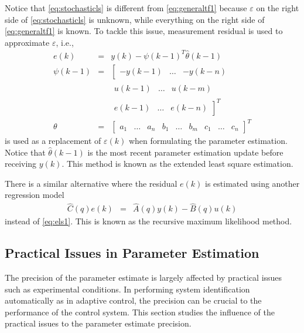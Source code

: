 Notice that \eqref{eq:stochasticls} is different from \eqref{eq:generaltf1} because $\varepsilon$ on the right side of \eqref{eq:stochasticls} is unknown, while everything on the right side of \eqref{eq:generaltf1} is known. To tackle this issue, measurement residual is used to approximate $\varepsilon$, i.e.,
\begin{eqnarray}
  e(k) &=& y(k) - \psi(k-1)^T\hat{\theta}(k-1) \label{eq:els1} \\
  \psi(k-1) &=& \left[\begin{array}{ccc}
                          -y(k-1) & \ldots & -y(k-n)
                        \end{array}\right. \nonumber \\
              & & \left.\begin{array}{ccc}
                          u(k-1) & \ldots & u(k-m)
                        \end{array}\right. \nonumber \\
              & & \left.\begin{array}{ccc}
                          e(k-1) & \ldots & e(k-n)
                        \end{array}\right]^T \nonumber \\
  \theta &=& \left[\begin{array}{ccccccccc}
                   a_1 & \ldots & a_n & b_1 & \ldots & b_m & c_1 & \ldots & c_n
                 \end{array}\right]^T \nonumber
\end{eqnarray}
is used as a replacement of $\varepsilon(k)$ when formulating the parameter estimation. Notice that $\hat{\theta}(k-1)$ is the most recent parameter estimation update before receiving $y(k)$. This method is known as the extended least square estimation.

There is a similar alternative where the residual $e(k)$ is estimated using another regression model
\begin{eqnarray}
\hat{C}(q)e(k) &=& \hat{A}(q)y(k) - \hat{B}(q)u(k) \nonumber
\end{eqnarray}
instead of \eqref{eq:els1}. This is known as the recursive maximum likelihood method.

\subsection{Practical Issues in Parameter Estimation}

The precision of the parameter estimate is largely affected by practical issues such as experimental conditions. In performing system identification automatically as in adaptive control, the precision can be crucial to the performance of the control system. This section studies the influence of the practical issues to the parameter estimate precision.

